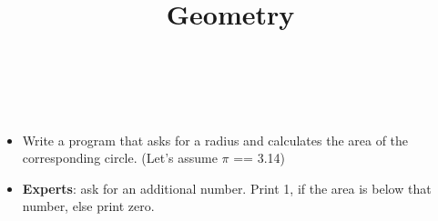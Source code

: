 


\title{Geometry} %
\author{} %
\renewcommand{\difficulty}{Easy} %
\renewcommand{\requirements}{Input/output, all kinds of operators} %
\renewcommand{\aims}{Coding with operators} %


 \maketitle
 \taskinfos

\ \\\ \\
\begin{itemize}
	\item Write a program that asks for a radius and calculates the area of the corresponding circle. (Let's assume $\pi$ == 3.14)
	\item \textbf{Experts}: ask for an additional number. Print 1, if the area is below that number, else print zero.
\end{itemize}	
 
 

